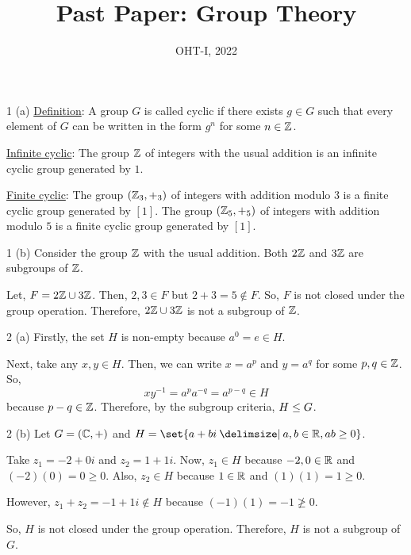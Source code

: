 \documentclass[11pt]{penrose}
\title{Past Paper: Group Theory}
\subtitle{OHT-I, 2022}
\begin{document}
\maketitle
\warningtext

\begin{problem}{1 (a)}
    \underline{Definition}: A group $G$ is called cyclic if there exists $g \in G$ such that every element of $G$ can be written in the form $g^n$ for some $n \in \mathbb{Z}$.

    \underline{Infinite cyclic}: The group $\mathbb{Z}$ of integers with the usual addition is an infinite cyclic group generated by $1$.
    
    \underline{Finite cyclic}: The group $(\mathbb{Z}_3, +_3)$ of integers with addition modulo $3$ is a finite cyclic group generated by $[1]$. The group $(\mathbb{Z}_5, +_5)$ of integers with addition modulo $5$ is a finite cyclic group generated by $[1]$.
\end{problem}

\begin{problem}{1 (b)}
    Consider the group $\mathbb{Z}$ with the usual addition. Both $2\mathbb{Z}$ and $3\mathbb{Z}$ are subgroups of $\mathbb{Z}$. 

    Let, $F = 2\mathbb{Z} \cup 3\mathbb{Z}$. Then, $2, 3 \in F$ but $2+3 = 5 \notin F$. So, $F$ is not closed under the group operation. Therefore, $2\mathbb{Z} \cup 3\mathbb{Z}$ is not a subgroup of $\mathbb{Z}$.
\end{problem}

\begin{problem}{2 (a)}
    Firstly, the set $H$ is non-empty because $a^0 = e \in H$.

    Next, take any $x, y \in H$. Then, we can write $x = a^p$ and $y = a^q$ for some $p, q \in \mathbb{Z}$. So,
    \begin{equation*}
        x y^{-1} = a^p a^{-q} = a^{p-q} \in H
    \end{equation*}
    because $p-q \in \mathbb{Z}$. Therefore, by the subgroup criteria, $H \mathrel{\leq} G$.
\end{problem}

\begin{problem}{2 (b)}
    Let $G = (\mathbb{C}, +)$ and $H = \set{a+bi \st a,b \in \R, ab \geq 0}$.

    Take $z_1 = -2 + 0i$ and $z_2 = 1 + 1i$. Now, $z_1 \in H$ because $-2, 0 \in \mathbb{R}$ and $(-2)(0) = 0 \geq 0$. Also, $z_2 \in H$ because $1 \in \mathbb{R}$ and $(1)(1) = 1 \geq 0$.

    However, $z_1 + z_2 = -1 + 1i \notin H$ because $(-1)(1) = -1 \ngeq 0$.

    So, $H$ is not closed under the group operation. Therefore, $H$ is not a subgroup of $G$.
\end{problem}
\end{document}
